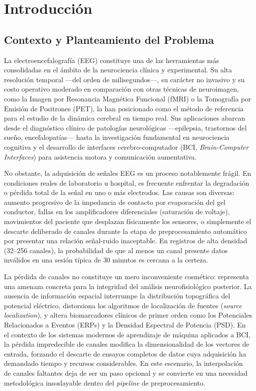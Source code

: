 \chapter{Introducción}

\section{Contexto y Planteamiento del Problema}

La electroencefalografía (EEG) constituye una de las herramientas más consolidadas en el ámbito de la neurociencia clínica y experimental. Su alta resolución temporal —del orden de milisegundos—, su carácter no invasivo y su costo operativo moderado en comparación con otras técnicas de neuroimagen, como la Imagen por Resonancia Magnética Funcional (fMRI) o la Tomografía por Emisión de Positrones (PET), la han posicionado como el método de referencia para el estudio de la dinámica cerebral en tiempo real. Sus aplicaciones abarcan desde el diagnóstico clínico de patologías neurológicas —epilepsia, trastornos del sueño, encefalopatías— hasta la investigación fundamental en neurociencia cognitiva y el desarrollo de interfaces cerebro-computador (BCI, \textit{Brain-Computer Interfaces}) para asistencia motora y comunicación aumentativa.

No obstante, la adquisición de señales EEG es un proceso notablemente frágil. En condiciones reales de laboratorio u hospital, es frecuente enfrentar la degradación o pérdida total de la señal en uno o más electrodos. Las causas son diversas: aumento progresivo de la impedancia de contacto por evaporación del gel conductor, fallas en los amplificadores diferenciales (saturación de voltaje), movimientos del paciente que desplazan físicamente los sensores, o simplemente el descarte deliberado de canales durante la etapa de preprocesamiento automático por presentar una relación señal-ruido inaceptable. En registros de alta densidad (32--256 canales), la probabilidad de que al menos un canal presente datos inválidos en una sesión típica de 30 minutos es cercana a la certeza.

La pérdida de canales no constituye un mero inconveniente cosmético: representa una amenaza concreta para la integridad del análisis neurofisiológico posterior. La ausencia de información espacial interrumpe la distribución topográfica del potencial eléctrico, distorsiona los algoritmos de localización de fuentes (\textit{source localization}), y altera biomarcadores clínicos de primer orden como los Potenciales Relacionados a Eventos (ERPs) y la Densidad Espectral de Potencia (PSD). En el contexto de los sistemas modernos de aprendizaje de máquina aplicados a BCI, la pérdida impredecible de canales modifica la dimensionalidad de los vectores de entrada, forzando el descarte de ensayos completos de datos cuya adquisición ha demandado tiempo y recursos considerables. En este escenario, la interpolación de canales faltantes deja de ser un paso opcional y se convierte en una necesidad metodológica insoslayable dentro del \textit{pipeline} de preprocesamiento.

